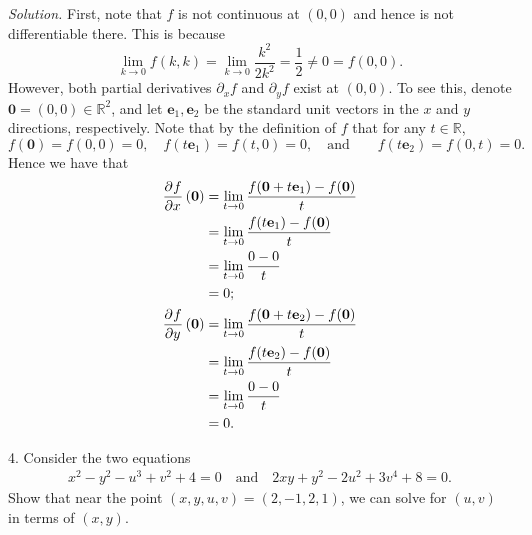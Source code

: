 \documentclass{article}
\newcommand{\0}{\mathbf{0}}
\newcommand{\ex}{\mathbf{e}_1}
\newcommand{\ey}{\mathbf{e}_2}
\newcommand{\R}{\mathbb{R}}
\begin{document}
\textit{Solution.}
First, note that $f$ is not continuous at $(0, 0)$ and hence is
not differentiable there. This is because
%
\begin{equation*}
    \lim_{k \to 0} f(k, k)
        = \lim_{k \to 0} \frac{k^2}{2 k^2}
        = \frac{1}{2} \neq 0
        = f(0, 0)
    .
\end{equation*}
%
However, both partial derivatives $\partial_x f$ and $\partial_y f$
exist at $(0, 0)$. To see this, denote $\0 = (0, 0) \in \R^2$, and let
$\ex, \ey$ be the standard unit vectors in the $x$ and $y$ directions,
respectively. Note that by the definition of $f$ that for any $t \in \R$,
%
\begin{equation*}
    f(\0) = f(0, 0) = 0, \quad
    f(t \ex) = f(t, 0) = 0, \quad
    \text{and} \qquad f(t \ey) = f(0, t) = 0
    .
\end{equation*}
%
Hence we have that
%
\begin{align*}
    \dpd{f}{x}(\0)
        &= \lim_{t \to 0} \frac{f(\0 + t \ex) - f(\0)}{t} \\
        &= \lim_{t \to 0} \frac{f(t \ex) - f(\0)}{t} \\
        &= \lim_{t \to 0} \frac{0 - 0}{t} \\
        &= 0; \\
    \dpd{f}{y}(\0)
        &= \lim_{t \to 0} \frac{f(\0 + t \ey) - f(\0)}{t} \\
        &= \lim_{t \to 0} \frac{f(t \ey) - f(\0)}{t} \\
        &= \lim_{t \to 0} \frac{0 - 0}{t} \\
        &= 0
        .
\end{align*}

\newpage

4. Consider the two equations
%
\begin{align*}
    x^2 - y^2 - u^3 + v^2 + 4 = 0
    \quad \text{and} \quad
    2 x y + y^2 - 2 u^2 + 3 v^4 + 8 = 0
    .
\end{align*}
%
Show that near the point $(x, y, u, v) = (2, -1, 2, 1)$, we can solve
for $(u, v)$ in terms of $(x, y)$.
\end{document}
